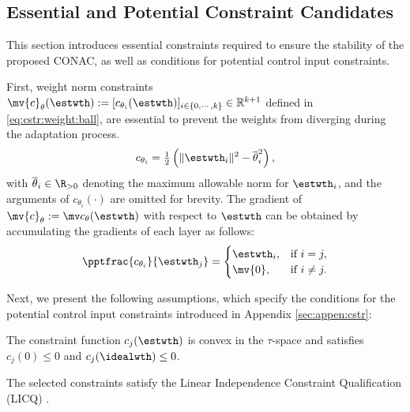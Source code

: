 \documentclass[journal]{IEEEtran}
\begin{document}
\subsection{Essential and Potential Constraint Candidates}\label{sec:sub:cstr} 

This section introduces essential constraints required to ensure the stability of the proposed CONAC, as well as conditions for potential control input constraints.

First, weight norm constraints $\mv{c}_{\theta}(\estwth):= [c_{\theta_i}(\estwth)]_{i\in\{0,\cdots ,k\}}\in\mathbb R^{k+1}$ defined in \eqref{eq:cstr:weight:ball}, are essential to prevent the weights from diverging during the adaptation process.
\begin{equation}
    c_{\theta_i}
    =
    \tfrac{1}{2}
    \left(
        \Vert \estwth_i\Vert^2 
        -
        \overline\theta_i^2 
    \right)    
    ,
    \label{eq:cstr:weight:ball}
\end{equation}
with $\overline\theta_i\in\R_{>0}$ denoting the maximum allowable norm for $\estwth_i$, and the arguments of $c_{\theta_i}(\cdot)$ are omitted for brevity.
The gradient of $\mv{c}_\theta:=\mv c_{\theta}(\estwth)$ with respect to $\estwth$ can be obtained by accumulating the gradients of each layer as follows:
\begin{equation}
    \pptfrac{c_{\theta_i}}{\estwth_j} 
    =
    \begin{cases}
        \estwth_i,
        &
        \text{if } i=j,
        \\
        \mv{0},
        &
        \text{if } i\ne j
        .
    \end{cases} 
    \label{eq:cstr:weight:ball:grad}
\end{equation}

Next, we present the following assumptions, which specify the conditions for the potential control input constraints introduced in Appendix \ref{sec:appen:cstr}:

\begin{assum}
    The constraint function $c_j(\estwth)$ is convex in the $\tau$-space and satisfies $c_j(0) \le 0$ and $c_j(\idealwth)\le 0$.
    \label{assum:convex}
\end{assum}

\begin{assum}
    The selected constraints satisfy the Linear Independence Constraint Qualification (LICQ) \cite[Chap.~12, Def.~12.1]{Nocedal:2006aa}.
    \label{assum:LICQ}
\end{assum}
\end{document}

